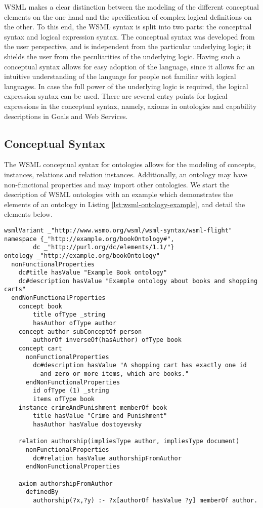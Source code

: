 WSML makes a clear distinction between the modeling of the different
conceptual elements on the one hand and the specification of complex
logical definitions on the other. To this end, the WSML syntax is
split into two parts: the conceptual syntax and logical expression
syntax. The conceptual syntax was developed from the user
perspective, and is independent from the particular underlying
logic; it shields the user from the peculiarities of the underlying
logic. Having such a conceptual syntax allows for easy adoption of
the language, since it allows for an intuitive understanding of the
language for people not familiar with logical languages. In case the
full power of the underlying logic is required, the logical
expression syntax can be used. There are several entry points for
logical expressions in the conceptual syntax, namely, axioms in
ontologies and capability descriptions in Goals and Web Services.

\subsection{Conceptual Syntax}
\label{sec:conceptual-syntax}

The WSML conceptual syntax for ontologies allows for the modeling of
concepts, instances, relations and relation instances. Additionally,
an ontology may have non-functional properties and may import other
ontologies. We start the description of WSML ontologies with an
example which demonstrates the elements of an ontology in Listing
\ref{lst:wsml-ontology-example}, and detail the elements below.

\begin{lstlisting}[label=lst:wsml-ontology-example,style=wsml]
wsmlVariant _"http://www.wsmo.org/wsml/wsml-syntax/wsml-flight"
namespace {_"http://example.org/bookOntology#",
        dc _"http://purl.org/dc/elements/1.1/"}
ontology _"http://example.org/bookOntology"
  nonFunctionalProperties
    dc#title hasValue "Example Book ontology"
    dc#description hasValue "Example ontology about books and shopping carts"
  endNonFunctionalProperties
    concept book
        title ofType _string
        hasAuthor ofType author
    concept author subConceptOf person
        authorOf inverseOf(hasAuthor) ofType book
    concept cart
      nonFunctionalProperties
        dc#description hasValue "A shopping cart has exactly one id
          and zero or more items, which are books."
      endNonFunctionalProperties
        id ofType (1) _string
        items ofType book
    instance crimeAndPunishment memberOf book
        title hasValue "Crime and Punishment"
        hasAuthor hasValue dostoyevsky

    relation authorship(impliesType author, impliesType document)
      nonFunctionalProperties
        dc#relation hasValue authorshipFromAuthor
      endNonFunctionalProperties

    axiom authorshipFromAuthor
      definedBy
        authorship(?x,?y) :- ?x[authorOf hasValue ?y] memberOf author.
\end{lstlisting}

